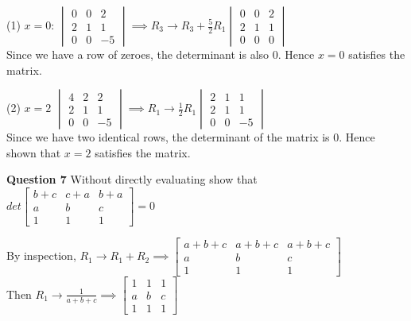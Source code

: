 \documentclass[addpoints]{exam}
\begin{document}
\begin{sloppypar}
\begin{questions}
\begin{solution}
            (1) $x = 0$:
            $ \begin{vmatrix}
                0 & 0 & 2 \\ 2 & 1 & 1 \\ 0 & 0 & -5
            \end{vmatrix} \implies R_3 \rightarrow R_3 + \frac{5}{2}R_1 \begin{vmatrix}
                0 & 0 & 2 \\ 2 & 1 & 1 \\ 0 & 0 & 0
            \end{vmatrix}$ \\ 
            Since we have a row of zeroes, the determinant is also 0. Hence $ x = 0 $ satisfies the matrix.

            (2) $ x = 2 $
            $ \begin{vmatrix}
                4 & 2 & 2 \\ 2 & 1 & 1 \\ 0 & 0 & -5
            \end{vmatrix} \implies R_1 \rightarrow \frac{1}{2}R_1 \begin{vmatrix}
                2 & 1 & 1 \\ 2 & 1 & 1 \\ 0 & 0 & -5
            \end{vmatrix}$ \\ 
            Since we have two identical rows, the determinant of the matrix is 0. Hence shown that $ x = 2 $ satisfies the matrix. 
        \end{solution}

        \question
        \textbf{Question 7} Without directly evaluating show that $ det \begin{bmatrix}
            b+c & c+a & b+a \\ a & b & c \\ 1 & 1 & 1 
        \end{bmatrix} = 0$
        \begin{solution}
            
            By inspection, $ R_1 \rightarrow R_1 + R_2 \implies \begin{bmatrix}
                a+b+c & a+b+c & a+b+c \\ a & b & c \\ 1 & 1 & 1
            \end{bmatrix} $ \\ Then $ R_1 \rightarrow \frac{1}{a + b + c} \implies \begin{bmatrix}
                1 & 1 & 1 \\ a & b & c \\ 1 & 1 & 1
            \end{bmatrix} $


\end{solution}
\end{questions}
\end{sloppypar}
\end{document}
